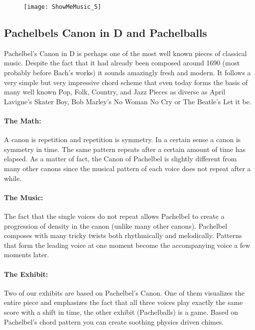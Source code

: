 \begin{figure}[h]
\centering
\texttt{[image: ShowMeMusic\_5]}
\end{figure}


\subsection{Pachelbels Canon in D and Pachelballs}
Pachelbel's Canon in D is perhaps one of the most well known pieces of classical music. Despite the fact that it had already been composed around 1690 (most probably before Bach's works) it sounds amazingly fresh and modern. It follows a very simple but very impressive chord scheme that even today forms the basis of many well known Pop, Folk, Country, and Jazz Pieces as diverse as April Lavigne's Skater Boy, Bob Marley's No Woman No Cry or The Beatle's Let it be.

\paragraph{The Math:} A canon is repetition and repetition is symmetry. In a certain sense a canon is symmetry in time. The same pattern repeats after a certain amount of time has elapsed. As a matter of fact, the Canon of Pachelbel is slightly different from many other canons since the musical pattern of each voice does not repeat after a while.

\paragraph{The Music:} The fact that the single voices do not repeat allows Pachelbel to create a progression of density in the canon (unlike many other canons). Pachelbel composes with many tricky twists both rhythmically and melodically. Patterns that form the leading voice at one moment become the accompanying voice a few moments later.

\paragraph{The Exhibit:} Two of our exhibits are based on Pachelbel's Canon. One of them visualizes the entire piece and emphasizes the fact that all three voices play exactly the same score with a shift in time, the other exhibit (Pachelballs) is a game. Based on Pachelbel's chord pattern you can create soothing physics driven chimes.


